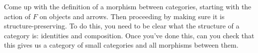 \begin{ttta}
Come up with the definition of a morphism between categories, starting
with the action of $F$ on objects and arrows. Then proceeding by making
sure it is structure-preserving. To do this, you need to be clear what the
structure of a category is: identities and composition. Once you've done this,
can you check that this gives us a category of small categories and all
morphisms between them.
\end{ttta}
